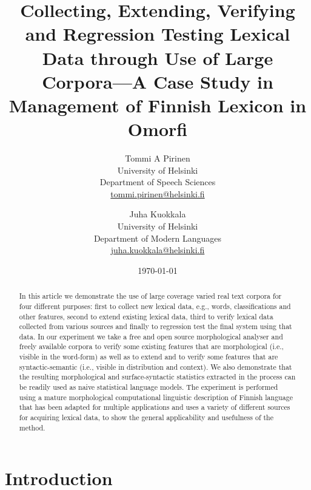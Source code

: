 \documentclass[a5paper]{article}
\title{Collecting, Extending, Verifying and Regression Testing Lexical Data through
Use of Large Corpora---A Case Study in Management of Finnish Lexicon in Omorfi}
\author{
Tommi A Pirinen\\
University of Helsinki\\
Department of Speech Sciences\\
\url{tommi.pirinen@helsinki.fi}
\and
Juha Kuokkala\\
University of Helsinki\\
Department of Modern Languages\\
\url{juha.kuokkala@helsinki.fi}
}
\date{\today}
\begin{document}
\maketitle

\begin{abstract} 
    
    In this article we demonstrate the use of large coverage varied real text
    corpora for four different purposes: first to collect new lexical data,
    e.g., words, classifications and other features, second to extend existing
    lexical data, third to verify lexical data collected from various sources
    and finally to regression test the final system using that data.  In our
    experiment we take a free and open source morphological analyser and freely
    available corpora to verify some existing features that are morphological
    (i.e., visible in the word-form) as well as to extend and to verify some
    features that are syntactic-semantic (i.e., visible in distribution and
    context). We also demonstrate that the resulting morphological and
    surface-syntactic statistics extracted in the process can be readily used
    as naive statistical language models. The experiment is performed using a
    mature morphological computational linguistic description of Finnish
    language that has been adapted for multiple applications and uses a variety
    of different sources for acquiring lexical data, to show the general
    applicability and usefulness of the method.

\end{abstract}

\section{Introduction}
\label{sec:introduction}
\end{document}
